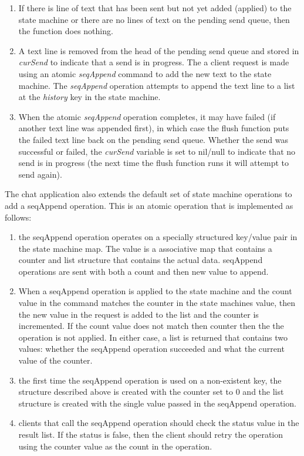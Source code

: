 \documentclass[9pt]{extarticle}
\begin{document}
\begin{multicols}{2}
\begin{enumerate}
\item If there is line of text that has been sent but not yet
    added (applied) to the state machine or there are no lines of text
    on the pending send queue, then the function does nothing.
\item A text line is removed from the head of the pending send queue
    and stored in \emph{curSend} to indicate that a send is in
    progress. The a client request is made using an atomic
    \emph{seqAppend} command to add the new text to the state machine.
    The \emph{seqAppend} operation attempts to append the text line to
    a list at the \emph{history} key in the state machine.
\item When the atomic \emph{seqAppend} operation completes, it may
    have failed (if another text line was appended first), in which
    case the flush function puts the failed text line back on the
    pending send queue. Whether the send was successful or failed, the
    \emph{curSend} variable is set to nil/null to indicate that no
    send is in progress (the next time the flush function runs it will
    attempt to send again).
\end{enumerate}

The chat application also extends the default set of state machine
operations to add a seqAppend operation. This is an atomic operation
that is implemented as follows:

\begin{enumerate}
\item the seqAppend operation operates on a specially structured
    key/value pair in the state machine map. The value is
    a associative map that contains a counter and list structure that
    contains the actual data. seqAppend operations are sent with both
    a count and then new value to append.
\item When a seqAppend operation is applied to the state machine and
    the count value in the command matches the counter in the state
    machines value, then the new value in the request is added to the
    list and the counter is incremented. If the count value does not
    match then counter then the the operation is not applied. In
    either case, a list is returned that contains two values: whether
    the seqAppend operation succeeded and what the current value of
    the counter.
\item the first time the seqAppend operation is used on a non-existent
    key, the structure described above is created with the counter set
    to 0 and the list structure is created with the single value
    passed in the seqAppend operation.
\item clients that call the seqAppend operation should check the
    status value in the result list. If the status is false, then the
    client should retry the operation using the counter value as the
    count in the operation.
\end{enumerate}


\end{multicols}
\end{document}
